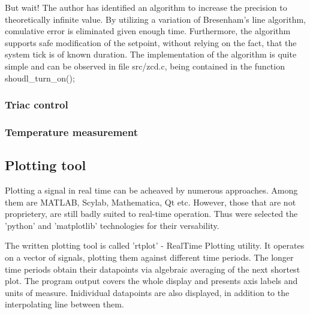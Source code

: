 \par
But wait!
The author has identified an algorithm to increase the precision to theoretically infinite value.
By utilizing a variation of Bresenham's line algorithm, comulative error is eliminated given enough time.
Furthermore, the algorithm supports safe modification of the setpoint, without relying on the fact, that the system tick is of known duration.
The implementation of the algorithm is quite simple and can be observed in file src/zcd.c, being contained in the function shoudl\_turn\_on();

\subsubsection{Triac control}
\subsubsection{Temperature measurement}

\subsection{Plotting tool}
Plotting a signal in real time can be acheaved by numerous approaches.
Among them are MATLAB, Scylab, Mathematica, Qt etc.
However, those that are not proprietery, are still badly suited to real-time operation.
Thus were selected the 'python' and 'matplotlib' technologies for their versability.
\par
The written plotting tool is called 'rtplot' - RealTime Plotting utility.
It operates on a vector of signals, plotting them against different time periods.
The longer time periods obtain their datapoints via algebraic averaging of the next shortest plot.
The program output covers the whole display and presents axis labels and units of measure.
Inidividual datapoints are also displayed, in addition to the interpolating line between them.
